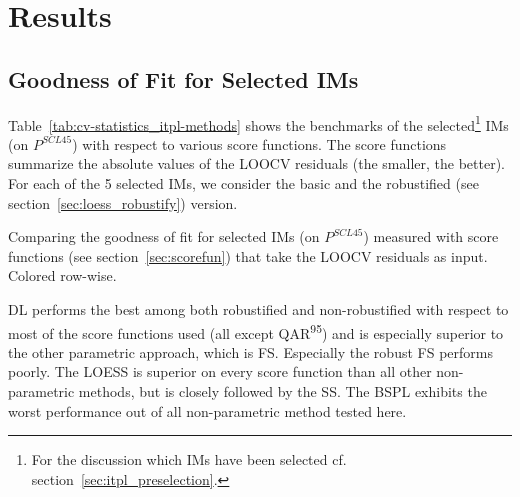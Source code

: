 \chapter{Results}\label{sec:results}

\section{Goodness of Fit for Selected {{IM}}s}{
	\label{sec:results_itpl}
	Table~\ref{tab:cv-statistics_itpl-methods} shows the benchmarks of the selected\footnote{\label{note:selected-IM} For the discussion which IMs have been selected cf. section~\ref{sec:itpl_preselection}.} {{IM}}s (on $P^{SCL45}$) with respect to various score functions. The score functions summarize the absolute values of the LOOCV residuals (the smaller, the better). For each of the 5 selected {{IM}}s, we consider the basic and the robustified (see section~\ref{sec:loess_robustify}) version.

	\begin{table}[h]
		\begin{center}
			\caption[Goodness of fit for {{IM}}s (on $P^{SCL45}$) measured with score functions.]{Comparing the goodness of fit for selected {{IM}}s (on $P^{SCL45}$) measured with score functions (see section~\ref{sec:scorefun}) that take the LOOCV residuals as input. Colored row-wise.}
			\scriptsize
			
			\normalsize
			\label{tab:cv-statistics_itpl-methods}
		\end{center}
	\end{table}
	
	DL performs the best among both robustified and non-robustified with respect to most of the score functions used (all except QAR\textsuperscript{95}) and is especially superior to the other parametric approach, which is FS. Especially the robust FS performs poorly. The LOESS is superior on every score function than all other non-parametric methods, but is closely followed by the SS. The BSPL exhibits the worst performance out of all non-parametric method tested here. 
}


